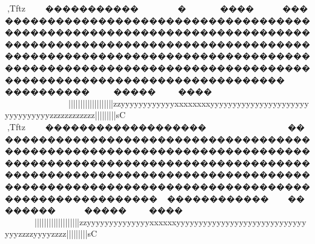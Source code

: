 {{{{{{{{{{{{{{{{{{{{{{{{{{{{{{{{{{{{{{{{{{{{{{{{{{{{{{{{{{{{{{{{{{{{{{{{{{{{{{{{{{{{{{{{{{{{{{{{{{{{{{{{{{{{{{{{{{{{{{{{{{{{{{{{{{{{{{{{{{{{{{{{{{{{{{{{{{{{{{{{{{{{{{{{{{{{{{{{{{{{{{{{{{{{{{{{{{{{{{{{{{{{{{{{{{{{{{{{{{{{{{{{{{{{{{{{{{{{{{{{{{{{{{{{{{{{{{{{{{{{{{{{{{{{{{{{{{{{{{{{{{{{{{{{{{{{{{{{{{{{{{{{{{{{{{{{{{{{{{{{{{{{{{{{{{{{{{{{{{{{{{{{{{{{{{{{{{{{{{{{{{{{{{{{{{{{{{{{{{{{{{{{{{{{{{{{{{{{{{{{{{{{{{{{{{{{{{{{{{{{{{{{{{{{{{{{{{{{{{{{{{{{{{{{{{{{{{{{{{{{{{{{{{{{{{{{{{{{{{{{{{{{{{{{{{{{{{{{{{{{{{{{{{{{{{{{{{{{{{{{{{{{{{{{{{{{{{{{{{{{{{{{{{{{{{{{{{{{{{{{{{{{{{{{{{{{{{{{{{{{{{{{{{{{{{{{{{{{{{{{{{{{{{{{{{{{{{{{{{{{{{{{{{{{{{{{{{{{{{{{{{{{{{{{{{{{{{{{{{{{{{{{{{{{{{{{{{{{{{{{{{{{{{{{{{{{{{{{{{{{{{{{{{{{{{{{{{{{{{{{{{{{{{{{{{{{{{{{{{{{{{{{{{{{{{{{{{{{{{{{{{{{{{{{{{{{{{{{{{{{{{{{{{{{{{{{{{{{{{{{{{{{{{{{{{{{{{{{{{{{{{{{{{{{{{{{{{{{{{{{{{{{{{{{{{{{{{{{{{{{{{{{{{{{{{{{{{{{{{{{{{{{{{{{{{{{{{{{{{{{{{{{{{{{{{{{{{{{{{{{{{{{{{{{{{{{{{{{{{{{{{{{{{{{{{{{{{{{{{{{{{{{{{{{{{{{{{{{{{{{{{{{{{{{{{{{{{{{{{{{{{{{{{{{{{{{{{{{{{{{{{{{{{{{{{{{{{{{{{{{{{{{{{{{{{{{{{{{{{{{{{{{{{{{{{{{{{{{{{{{{{{{{{{,Tftz~~~�����������~~~~~~~�~~~~~~~~�������������������������������������������������������������������������������������������������������������������������������������������������������������������������������������������������������������������������������������������~~}~����~~~~~~~~~~~~~~~~~~~~~~~~~~~~~~}}}}}}|||||||||||||||||||{zzyyyyyyyyyyyyxxxxxxxxyyyyyyyyyyyyyyyyyyyyyyyyyyyyyyyyzzzzzzzzzzzz{{{{|||||||||sC
,Tftz~~~�������������������~~~~~~~~���������������������������������������������������������������������������������������������������������������������������������������������������������������������������������������������������������������������������������~~}~����~~~~~~~~~~~~~~~~~~~~~~~~~~~~}}}}}}|||||||||||||||||||{zzyyyyyyyyyyyyyyxxxxxxyyyyyyyyyyyyyyyyyyyyyyyyyyyyyyyyzzzzyyyyzzzz{{{{|||||||||sC
}}}}}}}}}}}}}}}}}}}}}}}}}}}}}}}}}}}}}}}}}}}}}}}}}}}}}}}}}}}}}}}}}}}}}}}}}}}}}}}}}}}}}}}}}}}}}}}}}}}}}}}}}}}}}}}}}}}}}}}}}}}}}}}}}}}}}}}}}}}}}}}}}}}}}}}}}}}}}}}}}}}}}}}}}}}}}}}}}}}}}}}}}}}}}}}}}}}}}}}}}}}}}}}}}}}}}}}}}}}}}}}}}}}}}}}}}}}}}}}}}}}}}}}}}}}}}}}}}}}}}}}}}}}}}}}}}}}}}}}}}}}}}}}}}}}}}}}}}}}}}}}}}}}}}}}}}}}}}}}}}}}}}}}}}}}}}}}}}}}}}}}}}}}}}}}}}}}}}}}}}}}}}}}}}}}}}}}}}}}}}}}}}}}}}}}}}}}}}}}}}}}}}}}}}}}}}}}}}}}}}}}}}}}}}}}}}}}}}}}}}}}}}}}}}}}}}}}}}}}}}}}}}}}}}}}}}}}}}}}}}}}}}}}}}}}}}}}}}}}}}}}}}}}}}}}}}}}}}}}}}}}}}}}}}}}}}}}}}}}}}}}}}}}}}}}}}}}}}}}}}}}}}}}}}}}}}}}}}}}}}}}}}}}}}}}}}}}}}}}}}}}}}}}}}}}}}}}}}}}}}}}}}}}}}}}}}}}}}}}}}}}}}}}}}}}}}}}}}}}}}}}}}}}}}}}}}}}}}}}}}}}}}}}}}}}}}}}}}}}}}}}}}}}}}}}}}}}}}}}}}}}}}}}}}}}}}}}}}}}}}}}}}}}}}}}}}}}}}}}}}}}}}}}}}}}}}}}}}}}}}}}}}}}}}}}}}}}}}}}}}}}}}}}}}}}}}}}}}}}}}}}}}}}}}}}}}}}}}}}}}}}}}}}}}}}}}}}}}}}}}}}}}}}}}}}}}}}}}}}}}}}}}}}}}}}}}}}}}}}}}}}}}}}}}}}}}}}}}}}}}}}}}}}}}}}}}}}}}}}}}}}}}}}}}}}}}}}}}}}}}}}}}}}}}}}}}}}}}}}}}}}}}}}}}}}}}}}}}}}}}}}}}}}}}}}}}}}}}}}}}}}}}}}}}}}}}}}}}}}}}}}}}}}}}}}}}}}}}}}}}}}}}}}}}}}}}}}}}}}}}}}
